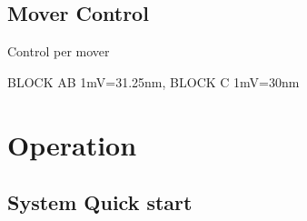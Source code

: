 \documentclass[a4paper,11pt]{book}
\begin{document}
\section{Mover Control}
Control per mover\par
\begin{center}
\end{center}
{\tiny BLOCK AB 1mV=31.25nm, BLOCK C 1mV=30nm}\par

\chapter{Operation}
\section{System Quick start}
\end{document}
